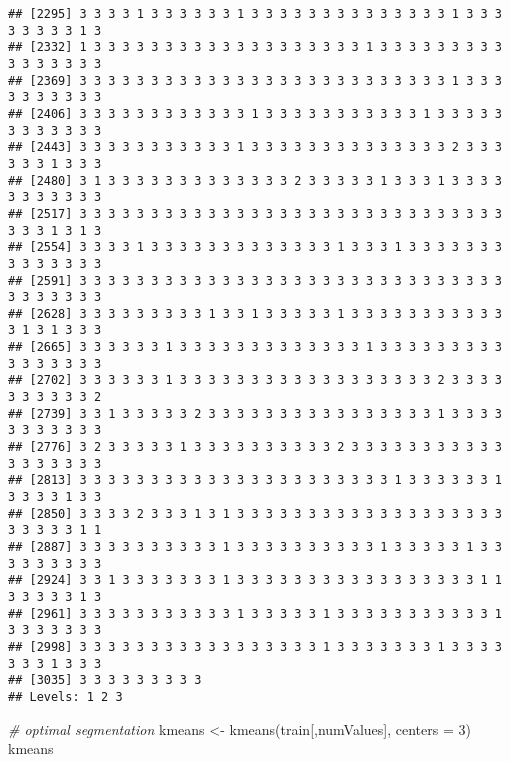 \documentclass[
]{article}
\newenvironment{Shaded}{\begin{snugshade}}{\end{snugshade}}
\newcommand{\AttributeTok}[1]{\textcolor[rgb]{0.77,0.63,0.00}{#1}}
\newcommand{\CommentTok}[1]{\textcolor[rgb]{0.56,0.35,0.01}{\textit{#1}}}
\newcommand{\DecValTok}[1]{\textcolor[rgb]{0.00,0.00,0.81}{#1}}
\newcommand{\FunctionTok}[1]{\textcolor[rgb]{0.00,0.00,0.00}{#1}}
\newcommand{\NormalTok}[1]{#1}
\newcommand{\OtherTok}[1]{\textcolor[rgb]{0.56,0.35,0.01}{#1}}
\begin{document}
\begin{verbatim}
## [2295] 3 3 3 3 1 3 3 3 3 3 3 1 3 3 3 3 3 3 3 3 3 3 3 3 3 3 1 3 3 3 3 3 3 3 3 1 3
## [2332] 1 3 3 3 3 3 3 3 3 3 3 3 3 3 3 3 3 3 3 3 1 3 3 3 3 3 3 3 3 3 3 3 3 3 3 3 3
## [2369] 3 3 3 3 3 3 3 3 3 3 3 3 3 3 3 3 3 3 3 3 3 3 3 3 3 3 1 3 3 3 3 3 3 3 3 3 3
## [2406] 3 3 3 3 3 3 3 3 3 3 3 3 1 3 3 3 3 3 3 3 3 3 3 3 1 3 3 3 3 3 3 3 3 3 3 3 3
## [2443] 3 3 3 3 3 3 3 3 3 3 3 1 3 3 3 3 3 3 3 3 3 3 3 3 3 3 2 3 3 3 3 3 3 1 3 3 3
## [2480] 3 1 3 3 3 3 3 3 3 3 3 3 3 3 3 2 3 3 3 3 3 1 3 3 3 1 3 3 3 3 3 3 3 3 3 3 3
## [2517] 3 3 3 3 3 3 3 3 3 3 3 3 3 3 3 3 3 3 3 3 3 3 3 3 3 3 3 3 3 3 3 3 3 1 3 1 3
## [2554] 3 3 3 3 1 3 3 3 3 3 3 3 3 3 3 3 3 3 1 3 3 3 1 3 3 3 3 3 3 3 3 3 3 3 3 3 3
## [2591] 3 3 3 3 3 3 3 3 3 3 3 3 3 3 3 3 3 3 3 3 3 3 3 3 3 3 3 3 3 3 3 3 3 3 3 3 3
## [2628] 3 3 3 3 3 3 3 3 3 1 3 3 1 3 3 3 3 3 1 3 3 3 3 3 3 3 3 3 3 3 3 1 3 1 3 3 3
## [2665] 3 3 3 3 3 3 1 3 3 3 3 3 3 3 3 3 3 3 3 3 1 3 3 3 3 3 3 3 3 3 3 3 3 3 3 3 3
## [2702] 3 3 3 3 3 3 1 3 3 3 3 3 3 3 3 3 3 3 3 3 3 3 3 3 3 2 3 3 3 3 3 3 3 3 3 3 2
## [2739] 3 3 1 3 3 3 3 3 2 3 3 3 3 3 3 3 3 3 3 3 3 3 3 3 3 1 3 3 3 3 3 3 3 3 3 3 3
## [2776] 3 2 3 3 3 3 3 1 3 3 3 3 3 3 3 3 3 3 2 3 3 3 3 3 3 3 3 3 3 3 3 3 3 3 3 3 3
## [2813] 3 3 3 3 3 3 3 3 3 3 3 3 3 3 3 3 3 3 3 3 3 3 1 3 3 3 3 3 3 1 3 3 3 3 1 3 3
## [2850] 3 3 3 3 2 3 3 3 1 3 1 3 3 3 3 3 3 3 3 3 3 3 3 3 3 3 3 3 3 3 3 3 3 3 3 1 1
## [2887] 3 3 3 3 3 3 3 3 3 3 1 3 3 3 3 3 3 3 3 3 3 1 3 3 3 3 3 1 3 3 3 3 3 3 3 3 3
## [2924] 3 3 1 3 3 3 3 3 3 3 1 3 3 3 3 3 3 3 3 3 3 3 3 3 3 3 3 3 1 1 3 3 3 3 3 1 3
## [2961] 3 3 3 3 3 3 3 3 3 3 3 1 3 3 3 3 3 1 3 3 3 3 3 3 3 3 3 3 3 1 3 3 3 3 3 3 3
## [2998] 3 3 3 3 3 3 3 3 3 3 3 3 3 3 3 3 3 1 3 3 3 3 3 3 3 1 3 3 3 3 3 3 3 1 3 3 3
## [3035] 3 3 3 3 3 3 3 3 3
## Levels: 1 2 3
\end{verbatim}

\begin{Shaded}
\begin{Highlighting}[]
\CommentTok{\# optimal segmentation}
\NormalTok{kmeans }\OtherTok{\textless{}{-}} \FunctionTok{kmeans}\NormalTok{(train[,numValues], }\AttributeTok{centers =} \DecValTok{3}\NormalTok{)}
\NormalTok{kmeans}
\end{Highlighting}
\end{Shaded}
\end{document}
